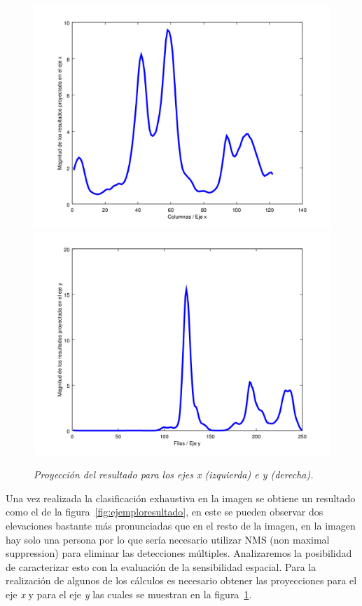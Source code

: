 \begin{figure}[htc]
  \centering
  \includegraphics[scale=.35]{images/proyeccionx}
  \includegraphics[scale=.35]{images/proyecciony}
  \caption{\em Proyección del resultado para los ejes x (izquierda) e y (derecha).}  
  \label{fig:proyecciones}
\end{figure}

Una vez realizada la clasificación exhaustiva en la imagen se obtiene un resultado como el de la figura~\ref{fig:ejemploresultado}, en este se pueden observar dos elevaciones bastante más pronunciadas que en el resto de la imagen, en la imagen hay solo una persona por lo que sería necesario utilizar NMS (non maximal suppression) para eliminar las detecciones múltiples. Analizaremos la posibilidad de caracterizar esto con la evaluación de la sensibilidad espacial. Para la realización de algunos de los cálculos es necesario obtener las proyecciones para el eje \textit{x} y para el eje \textit{y} las cuales se muestran en la figura~\ref{fig:proyecciones}.

